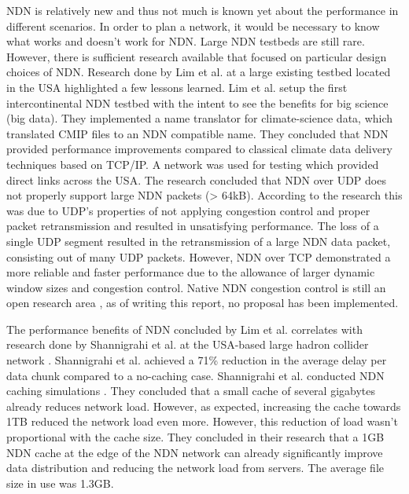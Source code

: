 NDN is relatively new and thus not much is known yet about the performance in different scenarios. In order to plan a network, it would be necessary to know what works and doesn't work for NDN. Large NDN testbeds are still rare. However, there is sufficient research available that focused on particular design choices of NDN. Research done by Lim et al. \cite{lim2018ndn} at a large existing testbed located in the USA \cite{ndn-testbed-status} highlighted a few lessons learned. Lim et al. setup the first intercontinental NDN testbed with the intent to see the benefits for big science (big data). They implemented a name translator for climate-science data, which translated CMIP files to an NDN compatible name. They concluded that NDN provided performance improvements compared to classical climate data delivery techniques based on TCP/IP. A network was used for testing which provided direct links across the USA. The research concluded that NDN over UDP does not properly support large NDN packets (> 64kB). According to the research this was due to UDP's properties of not applying congestion control and proper packet retransmission and resulted in unsatisfying performance. The loss of a single UDP segment resulted in the retransmission of a large NDN data packet, consisting out of many UDP packets. However, NDN over TCP demonstrated a more reliable and faster performance due to the allowance of larger dynamic window sizes and congestion control. Native NDN congestion control is still an open research area \cite{ren2016congestion}, as of writing this report, no proposal has been implemented.

The performance benefits of NDN concluded by Lim et al. correlates with research done by Shannigrahi et al. at the USA-based large hadron collider network \cite{shannigrahi2015named}. Shannigrahi et al. achieved a 71\% reduction in the average delay per data chunk compared to a no-caching case. Shannigrahi et al. conducted NDN caching simulations \cite{shannigrahi2017request}. They concluded that a small cache of several gigabytes already reduces network load. However, as expected, increasing the cache towards 1TB reduced the network load even more. However, this reduction of load wasn't proportional with the cache size. They concluded in their research that a 1GB NDN cache at the edge of the NDN network can already significantly improve data distribution and reducing the network load from servers. The average file size in use was 1.3GB.

